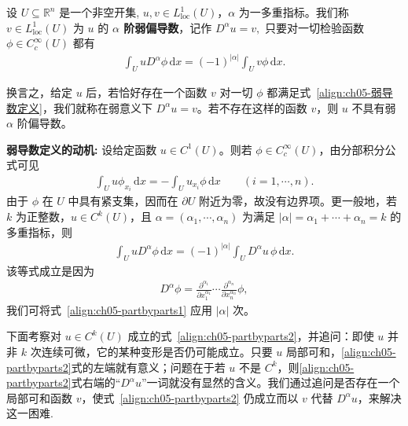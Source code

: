 \documentclass[../../main.tex]{subfiles}
\begin{document}
\begin{definition}\label{definition:ch05-弱偏导数}
设 $U \subseteq \mathbb{R}^n$ 是一个非空开集, $u,v\in L^{1}_{\mathrm{loc}}(U)$，$\alpha$ 为一多重指标。我们称 $v\in L^{1}_{\mathrm{loc}}(U)$ 为 $u$ 的 \textbf{$\alpha$ 阶弱偏导数}，记作
$D^{\alpha}u=v,$
只要对一切检验函数 $\phi\in C^{\infty}_{c}(U)$ 都有
\begin{align}
\int_{U}uD^{\alpha}\phi\,\mathrm{d}x=(-1)^{|\alpha|}\int_{U}v\phi\,\mathrm{d}x.
\label{align:ch05-弱导数定义}
\end{align}
\end{definition}
\begin{remark}
换言之，给定 $u$ 后，若恰好存在一个函数 $v$ 对一切 $\phi$ 都满足式~\eqref{align:ch05-弱导数定义}，我们就称在弱意义下 $D^{\alpha}u=v$。若不存在这样的函数 $v$，则 $u$ 不具有弱 $\alpha$ 阶偏导数。
\end{remark}
\begin{remark}
\textbf{弱导数定义的动机:} 设给定函数 $u\in C^{1}(U)$。则若 $\phi\in C^{\infty}_{c}(U)$，由分部积分公式可见
\begin{align}
\int_{U}u\phi_{x_{i}}\,\mathrm{d}x=-\int_{U}u_{x_{i}}\phi\,\mathrm{d}x \qquad (i=1,\cdots,n).
\label{align:ch05-partbyparts1}
\end{align}
由于 $\phi$ 在 $U$ 中具有紧支集，因而在 $\partial U$ 附近为零，故没有边界项。更一般地，若 $k$ 为正整数，$u\in C^{k}(U)$，且 $\alpha=(\alpha_{1},\cdots,\alpha_{n})$ 为满足 $|\alpha|=\alpha_{1}+\cdots+\alpha_{n}=k$ 的多重指标，则
\begin{align}
\int_{U}uD^{\alpha}\phi\,\mathrm{d}x=(-1)^{|\alpha|}\int_{U}D^{\alpha}u\,\phi\,\mathrm{d}x.
\label{align:ch05-partbyparts2}
\end{align}
该等式成立是因为
\begin{align*}
D^{\alpha}\phi=\frac{\partial^{\alpha_{1}}}{\partial x_{1}^{\alpha_{1}}}\cdots\frac{\partial^{\alpha_{n}}}{\partial x_{n}^{\alpha_{n}}}\phi,
\end{align*}
我们可将式~\eqref{align:ch05-partbyparts1} 应用 $|\alpha|$ 次。

下面考察对 $u\in C^{k}(U)$ 成立的式~\eqref{align:ch05-partbyparts2}，并追问：即使 $u$ 并非 $k$ 次连续可微，它的某种变形是否仍可能成立。只要 $u$ 局部可和，\eqref{align:ch05-partbyparts2}式的左端就有意义；问题在于若 $u$ 不是 $C^{k}$，则\eqref{align:ch05-partbyparts2}式右端的“$D^{\alpha}u$”一词就没有显然的含义。我们通过追问是否存在一个局部可和函数 $v$，使式~\eqref{align:ch05-partbyparts2} 仍成立而以 $v$ 代替 $D^{\alpha}u$，来解决这一困难.
\end{remark}
\end{document}
